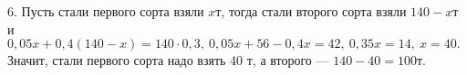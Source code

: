 6. Пусть стали первого сорта взяли $x$т, тогда стали второго сорта взяли $140-x$т и $0,05x+0,4(140-x)=140\cdot0,3,\ 0,05x+56-0,4x=42,\ 0,35x=14,\ x=40.$ Значит, стали первого сорта надо взять 40 т, а второго --- $140-40=100$т.\\
